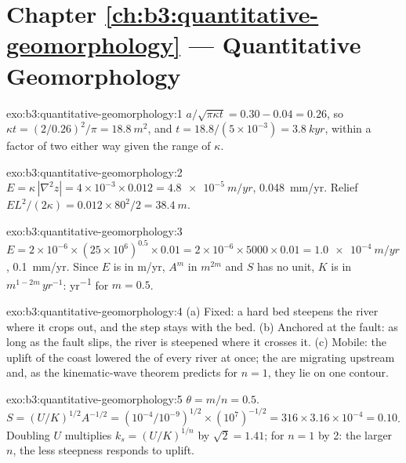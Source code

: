 \section*{Chapter \ref{ch:b3:quantitative-geomorphology} --- Quantitative Geomorphology}

\begin{solution}{exo:b3:quantitative-geomorphology:1}
$a/\sqrt{\pi\kappa t} = 0.30 - 0.04 = 0.26$, so $\kappa t = (2/0.26)^2/\pi =
\qty{18.8}{m^2}$, and $t = 18.8/(5\times10^{-3}) = \qty{3.8}{kyr}$, within a
factor of two either way given the range of $\kappa$.
\end{solution}

\begin{solution}{exo:b3:quantitative-geomorphology:2}
$E = \kappa\,|\nabla^2 z| = 4\times10^{-3}\times0.012 =
\qty{4.8e-5}{m/yr}$, \qty{0.048}{mm/yr}. Relief $E L^2/(2\kappa) =
0.012\times80^2/2 = \qty{38.4}{m}$.
\end{solution}

\begin{solution}{exo:b3:quantitative-geomorphology:3}
$E = 2\times10^{-6}\times(25\times10^6)^{0.5}\times0.01 = 2\times10^{-6}
\times5000\times0.01 = \qty{1.0e-4}{m/yr}$, \qty{0.1}{mm/yr}. Since $E$ is
in \unit{m/yr}, $A^m$ in $\unit{m}^{2m}$ and $S$ has no unit, $K$ is in
$\unit{m}^{1-2m}\,\unit{yr^{-1}}$: \unit{yr^{-1}} for $m = 0.5$.
\end{solution}

\begin{solution}{exo:b3:quantitative-geomorphology:4}
(a) Fixed: a hard bed steepens the river where it crops out, and the step
stays with the bed. (b) Anchored at the fault: as long as the fault slips,
the river is steepened where it crosses it. (c) Mobile: the uplift of the
coast lowered the  of every river at once; the 
are migrating upstream and, as the kinematic-wave theorem predicts for $n
= 1$, they lie on one contour.
\end{solution}

\begin{solution}{exo:b3:quantitative-geomorphology:5}
$\theta = m/n = 0.5$. $S = (U/K)^{1/2}A^{-1/2} = (10^{-4}/10^{-9})^{1/2}
\times(10^7)^{-1/2} = 316\times3.16\times10^{-4} = 0.10$. Doubling $U$
multiplies $k_s = (U/K)^{1/n}$ by $\sqrt2 = 1.41$; for $n = 1$ by 2: the
larger $n$, the less steepness responds to uplift.
\end{solution}

